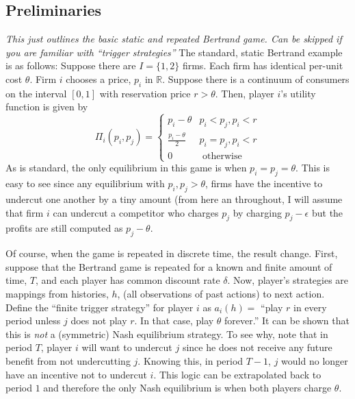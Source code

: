 \documentclass{article}
\begin{document}
\subsection{Preliminaries}
\textit{This just outlines the basic static and repeated Bertrand
  game.  Can be skipped if you are familiar with ``trigger
  strategies''}  The standard, static Bertrand example is as follows:  Suppose there are $I=\{1, 2\}$ firms.  Each firm has identical per-unit cost $\theta$.  Firm $i$ chooses a price, $p_i$ in $\mathbb{R}$.  Suppose there is a continuum of consumers on the interval $[0,1]$ with reservation price $r>\theta$. Then, player $i$'s utility function is given by 
\begin{equation}
    \Pi_i(p_i, p_j) =  \begin{cases} 
      p_i-\theta & p_i<p_j, p_i<r \\
      \frac{p_i-\theta}{2} & p_i=p_j, p_i<r \\
      0 & \text{ otherwise }
    \end{cases}
\label{eq:profits}
\end{equation}
As is standard, the only equilibrium in this game is when
$p_i=p_j=\theta$.  This is easy to see since any equilibrium with
$p_i,p_j>\theta$, firms have the incentive to undercut one another by
a tiny amount (from here an throughout, I will assume that firm $i$
can undercut a competitor who charges $p_j$ by charging $p_j-\epsilon$
but the profits are still computed as $p_j - \theta$.

Of course, when the game is repeated in discrete time, the result
change.  First, suppose that the Bertrand game is repeated for a known
and finite amount of time, $T$, and each player has common discount
rate $\delta$.  Now, player's strategies are mappings from histories, $h$,
(all observations of past actions) to next action.  Define the
``finite trigger strategy'' for player $i$ as $a_i(h) = $ ``play $r$
in every period unless $j$ does not play $r$.  In that case, play
$\theta$ forever.''  It can be shown that this is \emph{not} a (symmetric)
Nash equilibrium strategy.  To see why, note that in period $T$,
player $i$ will want to undercut $j$ since he does not receive any
future benefit from not undercutting $j$.  Knowing this, in period
$T-1$, $j$ would no longer have an incentive not to undercut $i$.
This logic can be extrapolated back to period $1$ and therefore the
only Nash equilibrium is when both players charge $\theta$. 
\end{document}
